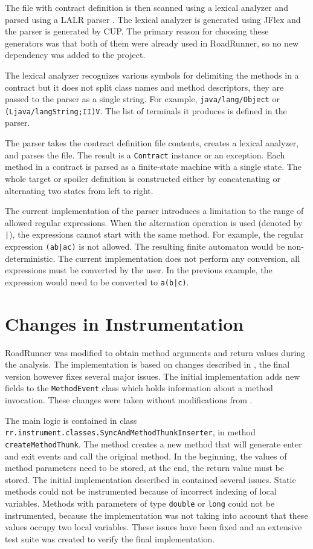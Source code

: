 The file with contract definition is then scanned using a lexical analyzer and
parsed using a LALR parser . The lexical analyzer is
generated using JFlex and the parser is generated by CUP. The primary reason for
choosing these generators was that both of them were already used in RoadRunner,
so no new dependency was added to the project.

The lexical analyzer recognizes various symbols for delimiting the methods in a
contract but it does not split class names and method descriptors, they are
passed to the parser as a single string. For example, \texttt{java/lang/Object}
or \texttt{(Ljava/langString;II)V}. The list of terminals it produces is defined
in the parser.

The parser takes the contract definition file contents, creates a lexical
analyzer, and parses the file. The result is a \texttt{Contract} instance or an
exception. Each method in a contract is parsed as a finite-state machine with a
single state. The whole target or spoiler definition is constructed either by
concatenating or alternating two states from left to right.

The current implementation of the parser introduces a limitation to the range of
allowed regular expressions. When the alternation operation is used (denoted by
\texttt{|}), the expressions cannot start with the same method. For example, the
regular expression \texttt{(ab|ac)} is not allowed. The resulting finite
automaton would be non-deterministic. The current implementation does not
perform any conversion, all expressions must be converted by the user. In the
previous example, the expression would need to be converted to \texttt{a(b|c)}.

\section{Changes in Instrumentation}
\label{instrImpl}
RoadRunner was modified to obtain method arguments and return values during the
analysis. The implementation is based on changes described in \cite{janousek},
the final version however fixes several major issues. The initial implementation
adds new fields to the \texttt{MethodEvent} class which holds information about
a method invocation. These changes were taken without modifications from
\cite{janousek}.

The main logic is contained in class 
\texttt{rr.instrument.classes.SyncAndMethodThunkInserter}, in method
\texttt{createMethodThunk}. The method creates a new method that will generate
enter and exit events and call the original method. In the beginning, the values
of method parameters need to be stored, at the end, the return value must be
stored. The initial implementation described in \cite{janousek} contained
several issues. Static methods could not be instrumented because of incorrect
indexing of local variables. Methods with parameters of type \texttt{double} or
\texttt{long} could not be instrumented, because the implementation was not
taking into account that these values occupy two local variables. These issues
have been fixed and an extensive test suite was created to verify the final
implementation.

